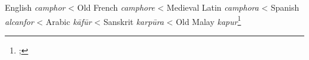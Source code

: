 \begin{etymology}\label{ety:camphor}
English \textit{camphor}
< Old French \textit{camphore}
< Medieval Latin \textit{camphora}
< Spanish \textit{alcanfor}
< Arabic \textit{kāfūr}
< Sanskrit \textit{karpūra}
< Old Malay \textit{kapur}\footnote{; }
\end{etymology}